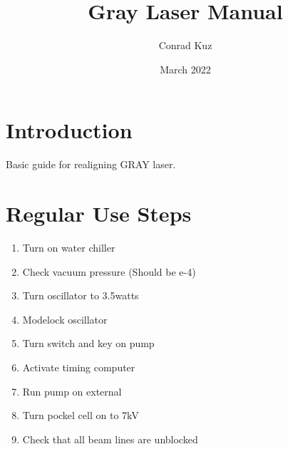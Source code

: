 \documentclass{article}
\title{Gray Laser Manual}
\author{Conrad Kuz}
\date{March 2022}
\begin{document}
\maketitle

\section{Introduction}
Basic guide for realigning GRAY laser.

\section{Regular Use Steps}
\begin{enumerate}
    \item Turn on water chiller
    \item Check vacuum pressure (Should be e-4)
    \item Turn oscillator to 3.5watts
    \item Modelock oscillator
    \item Turn switch and key on pump
    \item Activate timing computer
    \item Run pump on external
    \item Turn pockel cell on to 7kV
    \item Check that all beam lines are unblocked
\end{enumerate}
\end{document}
